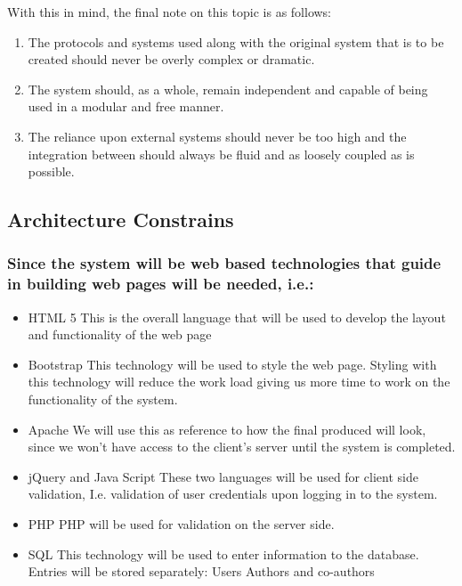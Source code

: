 \documentclass[hidelinks,a4paper,12pt]{article}
\begin{document}
	With this in mind, the final note on this topic is as follows: 
	\begin{enumerate}
		\item The protocols and systems used along with the original system that is to be created should never be overly complex or dramatic. 
		\item The system should, as a whole, remain independent and capable of being used in a modular and free manner. 
		\item The reliance upon external systems should never be too high and the integration between should always be fluid and as loosely coupled as is possible.
	\end{enumerate}
	
	\subsection{Architecture Constrains}
			\subsubsection{ Since the system will be web based technologies that guide in building web pages will be needed, i.e.:}
		
		\begin{itemize} 
			\item HTML 5
			\newline
			This is the overall language that will be used to develop the layout and functionality of the web page
				\item Bootstrap
				\newline
			This technology will be used to style the web page. Styling with this technology will reduce the work load giving us more time to work on the 				functionality of the system.
				\item Apache
				\newline
			We will use this as reference to how the final produced will look, since we won’t have access to the client’s server until the system is completed.	
				\item jQuery and Java Script
				\newline
			These two languages will be used for client side validation, I.e. validation of user credentials upon logging in to the system.	
				\item PHP
				\newline
			PHP will be used for validation on the server side.	
				\item SQL
				\newline  
			This technology will be used to enter information to the database. Entries will be stored separately:
			Users
			Authors and co-authors
		\end{itemize}
		
\end{document}
